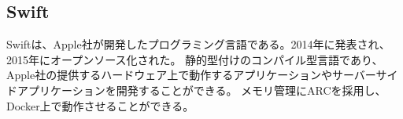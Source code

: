 \documentclass[../../../main]{subfiles}
\begin{document}
    \subsection{Swift}\label{subsec:phraseology-swift}

    Swiftは、Apple社が開発したプログラミング言語である。2014年に発表され、2015年にオープンソース化された。
    静的型付けのコンパイル型言語であり、Apple社の提供するハードウェア上で動作するアプリケーションやサーバーサイドアプリケーションを開発することができる。
    メモリ管理にARCを採用し、Docker上で動作させることができる。
\end{document}
